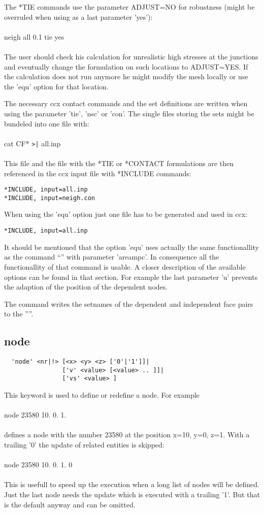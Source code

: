 \documentclass{article}
\begin{document}
The *TIE commands use the parameter ADJUST=NO for robustness (might be overruled when using as a last parameter 'yes'):\\\\ neigh all 0.1 tie yes\\\\The user should check his calculation for unrealistic high stresses at the junctions and eventually change the formulation on such locations to ADJUST=YES. If the calculation does not run anymore he might modify the mesh locally or use the 'equ' option for that location.

The necessary ccx contact commands and the set definitions are written when using the parameter 'tie', 'nsc' or 'con'. The single files storing the sets might be bundeled into one file with:\\\\cat CF* \verb_>|_ all.inp\\\\This file and the file with the *TIE or *CONTACT formulations are then referenced in the ccx input file with *INCLUDE commands:
\begin{verbatim}
*INCLUDE, input=all.inp
*INCLUDE, input=neigh.con
\end{verbatim}
When using the 'equ' option just one file has to be generated and used in ccx:
\begin{verbatim}
*INCLUDE, input=all.inp
\end{verbatim}

It should be mentioned that the option 'equ' uses actually the same functionallity as the command ``'' with parameter 'areampc'. In consequence all the functionallity of that command is usable. A closer description of the available options can be found in that section. For example the last parameter 'u' prevents the adaption of the position of the dependent nodes.

The command writes the setnames of the dependent and independent face pairs to the ''''.

\subsection{\label{node}node}
\begin{verbatim}
  'node' <nr|!> [<x> <y> <z> ['0'|'1']]|
                ['v' <value> [<value> .. ]]|
                ['vs' <value> ]
\end{verbatim}
This keyword is used to define or redefine a node. For example\\\\node 23580 10. 0. 1.\\\\defines a node with the number 23580 at the position x=10, y=0, z=1. With a trailing '0' the update of related entities is skipped:\\\\node 23580 10. 0. 1. 0\\\\This is usefull to speed up the execution when a long list of nodes will be defined. Just the last node needs the update which is executed with a trailing '1'. But that is the default anyway and can be omitted.
\end{document}
